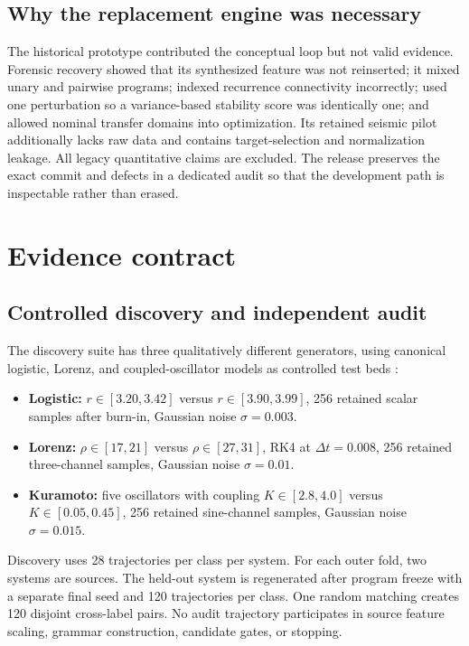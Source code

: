 \documentclass[10pt]{article}
\theoremstyle{definition}
\theoremstyle{remark}
\begin{document}
\subsection{Why the replacement engine was necessary}

The historical prototype contributed the conceptual loop but not valid evidence. Forensic recovery showed that its synthesized feature was not reinserted; it mixed unary and pairwise programs; indexed recurrence connectivity incorrectly; used one perturbation so a variance-based stability score was identically one; and allowed nominal transfer domains into optimization. Its retained seismic pilot additionally lacks raw data and contains target-selection and normalization leakage. All legacy quantitative claims are excluded. The release preserves the exact commit and defects in a dedicated audit so that the development path is inspectable rather than erased.

\section{Evidence contract}
\label{sec:protocol}

\subsection{Controlled discovery and independent audit}

The discovery suite has three qualitatively different generators, using canonical logistic, Lorenz, and coupled-oscillator models as controlled test beds \citep{May1976,Lorenz1963,Kuramoto1975}:
\begin{itemize}
\item \textbf{Logistic:} $r\in[3.20,3.42]$ versus $r\in[3.90,3.99]$, 256 retained scalar samples after burn-in, Gaussian noise $\sigma=0.003$.
\item \textbf{Lorenz:} $\rho\in[17,21]$ versus $\rho\in[27,31]$, RK4 at $\Delta t=0.008$, 256 retained three-channel samples, Gaussian noise $\sigma=0.01$.
\item \textbf{Kuramoto:} five oscillators with coupling $K\in[2.8,4.0]$ versus $K\in[0.05,0.45]$, 256 retained sine-channel samples, Gaussian noise $\sigma=0.015$.
\end{itemize}
Discovery uses 28 trajectories per class per system. For each outer fold, two systems are sources. The held-out system is regenerated after program freeze with a separate final seed and 120 trajectories per class. One random matching creates 120 disjoint cross-label pairs. No audit trajectory participates in source feature scaling, grammar construction, candidate gates, or stopping.
\end{document}
